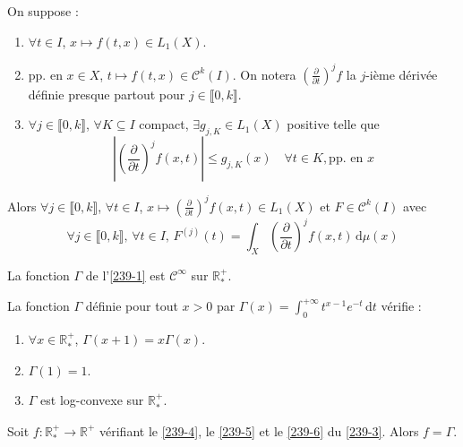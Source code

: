   \begin{theorem}
    On suppose :
    \begin{enumerate}[label=(\roman*)]
      \item $\forall t \in I$, $x \mapsto f(t,x) \in L_1(X)$.
      \item pp. en $x \in X$, $t \mapsto f(t,x) \in \mathcal{C}^k(I)$. On notera $\left(\frac{\partial}{\partial t}\right)^j f$ la $j$-ième dérivée définie presque partout pour $j \in \llbracket 0, k \rrbracket$.
      \item $\forall j \in \llbracket 0, k \rrbracket$, $\forall K \subseteq I$ compact, $\exists g_{j,K} \in L_1(X)$ positive telle que
      \[ \left| \left(\frac{\partial}{\partial t}\right)^j f(x,t) \right| \leq g_{j,K}(x) \quad \forall t \in K, \text{pp. en } x \]
    \end{enumerate}
    Alors $\forall j \in \llbracket 0, k \rrbracket$, $\forall t \in I$, $x \mapsto \left(\frac{\partial}{\partial t}\right)^j f(x,t) \in L_1(X)$ et $F \in \mathcal{C}^k(I)$ avec
    \[ \forall j \in \llbracket 0, k \rrbracket, \, \forall t \in I, \, F^{(j)}(t) = \int_X \left(\frac{\partial}{\partial t}\right)^j f(x, t) \, \mathrm{d}\mu(x) \]
  \end{theorem}


  \begin{example}
    La fonction $\Gamma$ de l'\cref{239-1} est $\mathcal{C}^\infty$ sur $\mathbb{R}^+_*$.
  \end{example}
  
  
  \begin{lemma}
    \label{239-3}
    La fonction $\Gamma$ définie pour tout $x > 0$ par $\Gamma(x) = \int_0^{+\infty} t^{x-1} e^{-t} \, \mathrm{d}t$ vérifie :
    \begin{enumerate}[label=(\roman*)]
      \item \label{239-4} $\forall x \in \mathbb{R}^+_*$, $\Gamma(x+1) = x\Gamma(x)$.
      \item \label{239-5} $\Gamma(1) = 1$.
      \item \label{239-6} $\Gamma$ est log-convexe sur $\mathbb{R}^+_*$.
    \end{enumerate}
  \end{lemma}
  
  
  \begin{theorem}
    Soit $f : \mathbb{R}^+_* \rightarrow \mathbb{R}^+$ vérifiant le \cref{239-4}, le \cref{239-5} et le \cref{239-6} du \cref{239-3}. Alors $f = \Gamma$.
  \end{theorem}

